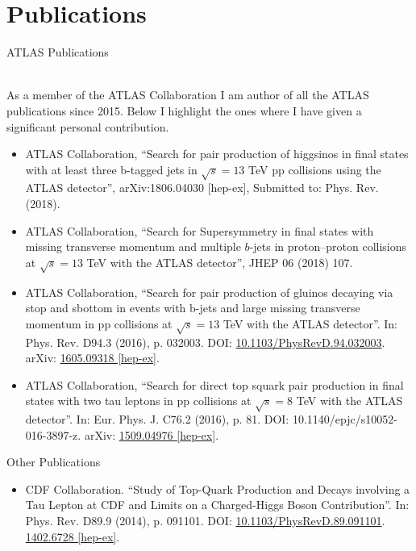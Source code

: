 \documentclass[11pt,a4paper]{moderncv}
\begin{document}
\section{Publications}
\color{color1}\begin{large}ATLAS Publications\end{large}\\ \color{black}
As a member of the ATLAS Collaboration I am author of all the ATLAS publications since 2015. Below I highlight the ones where I have given a significant personal contribution.
\begin{itemize} 
\item  ATLAS Collaboration, ``Search for pair production of higgsinos in final states with at least three b-tagged jets in $\sqrt{s} = 13$ TeV pp collisions using the ATLAS detector'',  
arXiv:1806.04030 [hep-ex], 
Submitted to: Phys. Rev. (2018).
\item  ATLAS Collaboration, ``Search for Supersymmetry in final states with missing transverse momentum and multiple $b$-jets in proton–proton collisions at $\sqrt{s} = 13$ TeV with the ATLAS detector'', JHEP 06 (2018) 107. 
\item ATLAS Collaboration, ``Search for pair production of gluinos decaying via stop and sbottom in events with b-jets and large missing transverse momentum in pp collisions at $\sqrt{s} = 13$ TeV with the ATLAS detector''. In: Phys. Rev. D94.3 (2016), p. 032003. DOI: \href{https://journals.aps.org/prd/abstract/10.1103/PhysRevD.94.032003}{\color{color1}10.1103/PhysRevD.94.032003}. arXiv: \href{https://arxiv.org/abs/1605.09318}{\color{color1}1605.09318 [hep-ex]}.
\item ATLAS Collaboration, ``Search for direct top squark pair production in final states with two tau leptons in pp collisions at $\sqrt{s} = 8$ TeV with the ATLAS detector''. In: Eur. Phys. J. C76.2 (2016), p. 81. DOI: 10.1140/epjc/s10052-016-3897-z. arXiv: \href{https://arxiv.org/abs/1509.04976}{\color{color1}1509.04976 [hep-ex]}.
\end{itemize}
\par\medskip
\color{color1}\begin{large}Other Publications\end{large}\color{black}
\begin{itemize} 
\item CDF Collaboration. ``Study of Top-Quark Production and Decays involving a Tau Lepton at CDF and Limits on a Charged-Higgs Boson Contribution''. In: Phys. Rev. D89.9 (2014), p. 091101. DOI: \href{https://journals.aps.org/prd/abstract/10.1103/PhysRevD.89.091101}{\color{color1}10.1103/PhysRevD.89.091101}. \href{https://arxiv.org/abs/1402.6728}{\color{color1}1402.6728 [hep-ex]}.
\end{itemize}
\end{document}
